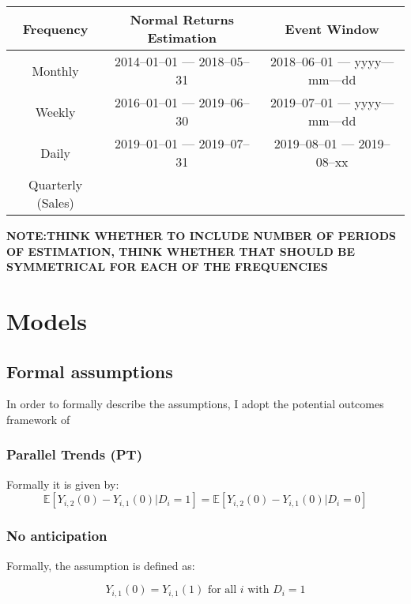 \documentclass[12pt]{article}
\begin{document}
\begin{table}[!h]
    \label{tab:data_freq}
    \begin{tabular}{ccc}
        \toprule
        Frequency & Normal Returns Estimation & Event Window \\
        \midrule
        Monthly & 2014--01--01 --- 2018--05--31 & 2018--06--01 --- yyyy---mm---dd \\ 
        Weekly & 2016--01--01 --- 2019--06--30 & 2019--07--01 --- yyyy---mm---dd \\
        Daily & 2019--01--01 --- 2019--07--31 & 2019--08--01 --- 2019--08--xx\\
        Quarterly (Sales) && \\ 
        \bottomrule
    \end{tabular}
    \begin{tablenotes}
        \footnotesize
        \item \textbf{NOTE:\@ THINK WHETHER TO INCLUDE NUMBER OF PERIODS OF ESTIMATION, THINK WHETHER THAT SHOULD BE SYMMETRICAL FOR EACH OF THE FREQUENCIES}
      \end{tablenotes}
\end{table}


\newpage
\normalsize
\raggedright{}
\section{Models}\label{app:models}

\subsection{Formal assumptions}\label{app:models:assumptions}
In order to formally describe the assumptions, I adopt the potential outcomes framework of~\cite{rubinEstimatingCausalEffects1974}

\subsubsection{Parallel Trends (PT)}

Formally it is given by: 
\begin{equation}
    \mathbb{E}[Y_{i,2}(0) - Y_{i,1}(0) | D_i = 1] = \mathbb{E}[Y_{i,2}(0) - Y_{i,1}(0) | D_i = 0]
\end{equation}

\subsubsection{No anticipation}
Formally, the assumption is defined as:

\begin{equation}
    Y_{i,1}(0) = Y_{i,1}(1) \text{ for all } i \text{ with } D_i = 1
\end{equation}


\end{document}
